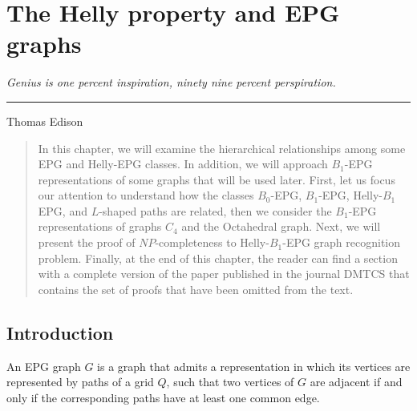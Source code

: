 \chapter{The Helly property and EPG graphs}\label{cap:capiii}

\begin{flushright}
\begin{minipage}[t][0cm][b]{0.47\textwidth}
\emph{
Genius is one percent inspiration, ninety nine percent perspiration.
}
\end{minipage}

\rule[0cm]{7cm}{0.03cm}%

Thomas Edison
\end{flushright}


\begin{quotation}
In this chapter, we will examine the hierarchical relationships among some EPG and Helly-EPG classes. In addition, we will approach $ B_1$-EPG representations of some graphs that will be used later. First, let us focus our attention to understand how the classes $B_0$-EPG, $B_1$-EPG,  Helly-$B_1$ EPG, and  $L$-shaped paths are related, then we consider the $ B_1$-EPG representations of graphs $C_4 $ and the Octahedral graph. Next, we will present the proof of $NP$-completeness to Helly-$B_1$-EPG graph recognition problem. Finally, at the end of this chapter, the reader can find a section with a complete version of the paper published in the journal DMTCS that contains the set of proofs that have been omitted from the text.
\end{quotation}

\section{Introduction}
An EPG graph $G$ is a graph that admits a representation in which its vertices are represented by paths of a grid $Q$, such that two vertices of $G$ are adjacent if and only if the corresponding paths have at least one common edge.

